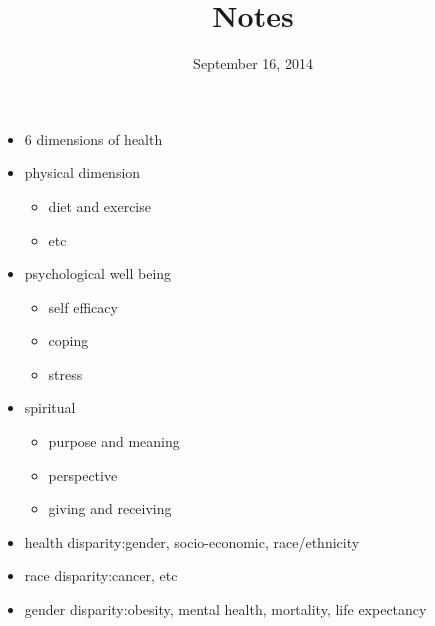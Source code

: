 \documentclass[letterpaper]{article}
\begin{document}
\title{Notes}
\date{September 16, 2014}
\maketitle
\begin{itemize}
\item
6 dimensions of health
\item
physical dimension
\begin{itemize}
\item
diet and exercise
\item etc
\end{itemize}
\item
psychological well being
\begin{itemize}
\item
self efficacy
\item
coping
\item
stress
\end{itemize}
\item spiritual
\begin{itemize}
\item
purpose and meaning
\item
perspective
\item
giving and receiving
\end{itemize}
\item
health disparity:gender, socio-economic, race/ethnicity
\item race disparity:cancer, etc
\item gender disparity:obesity, mental health, mortality, life expectancy

\end{itemize}
\end{document}

